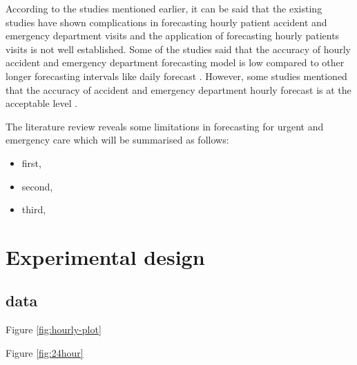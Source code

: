 \documentclass[]{elsarticle} %
\providecommand{\tightlist}{%
  \setlength{\itemsep}{0pt}\setlength{\parskip}{0pt}}
\begin{document}
According to the studies mentioned earlier, it can be said that the existing studies have shown complications in forecasting hourly patient accident and emergency department visits and the application of forecasting hourly patients visits is not well established. Some of the studies said that the accuracy of hourly accident and emergency department forecasting model is low compared to other longer forecasting intervals like daily forecast \citep{boyle2012predicting, hertzum2017forecasting}. However, some studies mentioned that the accuracy of accident and emergency department hourly forecast is at the acceptable level \citep{choudhury2020forecasting, mccarthy2008challenge, schweigler2009forecasting}.

The literature review reveals some limitations in forecasting for urgent and emergency care which will be summarised as follows:

\begin{itemize}
\tightlist
\item
  first,
\item
  second,
\item
  third,
\end{itemize}

\hypertarget{design}{%
\section{Experimental design}\label{design}}

\hypertarget{data}{%
\subsection{data}\label{data}}

Figure \ref{fig:hourly-plot}

Figure \ref{fig:24hour}
\end{document}
